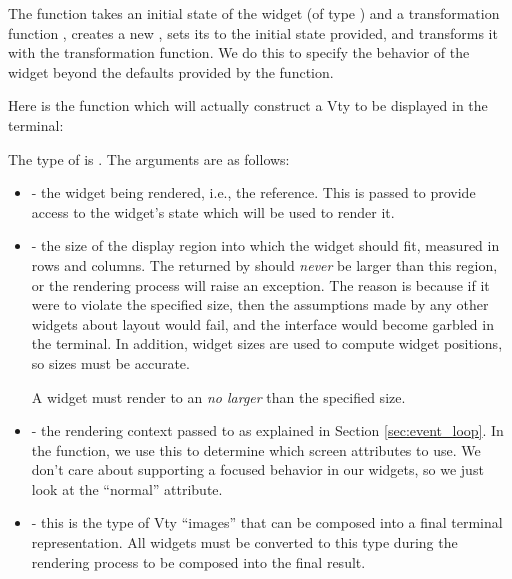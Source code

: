 The  function takes an initial state of the widget (of
type ) and a transformation function , creates a new , sets its  to
the initial state provided, and transforms it with the transformation
function.  We do this to specify the behavior of the widget beyond the
defaults provided by the  function.

Here is the  function which will actually construct a Vty
 to be displayed in the terminal:


The type of  is .  The arguments are as follows:

\begin{itemize}
\item {} - the widget being rendered, i.e., the  reference.  This is passed to provide access to the
  widget's state which will be used to render it.
\item {} - the size of the display region into which
  the widget should fit, measured in rows and columns.  The 
  returned by  should \textit{never} be larger than this
  region, or the rendering process will raise an exception.  The
  reason is because if it were to violate the specified size, then the
  assumptions made by any other widgets about layout would fail, and
  the interface would become garbled in the terminal.  In addition,
  widget sizes are used to compute widget positions, so sizes must be
  accurate.

  A widget must render to an  \textit{no larger} than the
  specified size.
\item {} - the rendering context passed to 
  as explained in Section \ref{sec:event_loop}.  In the 
  function, we use this to determine which screen attributes to use.
  We don't care about supporting a focused behavior in our
   widgets, so we just look at the ``normal'' attribute.
\item {} - this is the type of Vty ``images'' that can be
  composed into a final terminal representation.  All widgets must be
  converted to this type during the rendering process to be composed
  into the final result.
\end{itemize}

